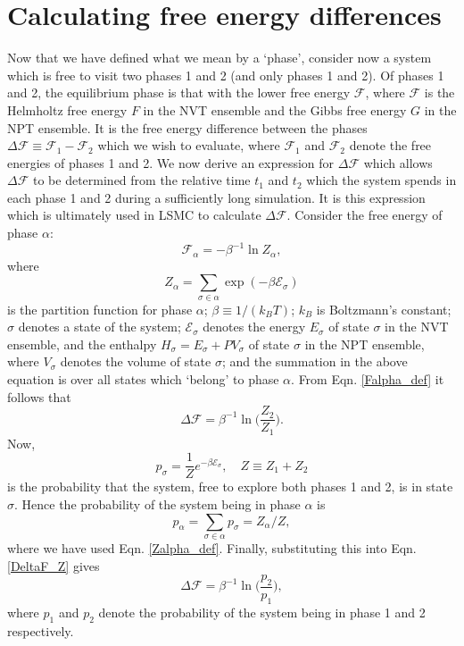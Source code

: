 \documentclass{report}
\begin{document}
\section{Calculating free energy differences}
Now that we have defined what we mean by a `phase', consider now a system which is free to visit two phases 1 and 2 (and only phases 1 and 2).
Of phases 1 and 2, the equilibrium phase is that with the lower free energy $\mathcal{F}$, where $\mathcal{F}$ is the Helmholtz free energy $F$ in the 
NVT ensemble and the Gibbs free energy $G$ in the NPT ensemble. It is the free energy difference between the phases 
$\Delta\mathcal{F}\equiv \mathcal{F}_1-\mathcal{F}_2$ which we wish to evaluate, where $\mathcal{F}_1$ and $\mathcal{F}_2$ denote the free energies of 
phases 1 and 2.
We now derive an expression for $\Delta \mathcal{F}$ which allows $\Delta \mathcal{F}$ to be determined from the relative time $t_1$ and $t_2$ which 
the system spends in each phase 1 and 2 during a sufficiently long simulation. It is this expression which is ultimately used in LSMC to calculate 
$\Delta \mathcal{F}$. Consider the free energy of phase $\alpha$:
\begin{equation}\label{Falpha_def}
\mathcal{F}_{\alpha}=-\beta^{-1}\ln Z_{\alpha},
\end{equation}
where
\begin{equation}\label{Zalpha_def}
Z_{\alpha}=\sum_{\sigma\in\alpha}\exp(-\beta \mathcal{E}_{\sigma})
\end{equation}
is the partition function for phase $\alpha$; $\beta\equiv 1/(k_BT)$; $k_B$ is Boltzmann's constant; $\sigma$ denotes a state of the system;
$\mathcal{E}_{\sigma}$ denotes the energy $E_{\sigma}$ of state $\sigma$ in the NVT ensemble, and the enthalpy $H_{\sigma}=E_{\sigma}+PV_{\sigma}$ of
state $\sigma$ in the NPT ensemble, where $V_{\sigma}$ denotes the volume of state $\sigma$; 
and the summation in the above equation is over all states which `belong' to phase $\alpha$. 
From Eqn. \eqref{Falpha_def} it follows that
\begin{equation}\label{DeltaF_Z}
\Delta \mathcal{F}=\beta^{-1}\ln\biggl(\frac{Z_2}{Z_1}\biggr).
\end{equation}
Now,
\begin{equation}\label{MC_prob}
p_{\sigma}=\frac{1}{Z}e^{-\beta \mathcal{E}_{\sigma}}, \quad Z\equiv Z_1+Z_2
\end{equation}
is the probability that the system, free to explore both phases 1 and 2, is in state $\sigma$. Hence the probability of the system being in
phase $\alpha$ is
\begin{equation}
p_{\alpha} = \sum_{\sigma\in \alpha}p_{\sigma} = Z_{\alpha}/Z,
\end{equation}
where we have used Eqn. \eqref{Zalpha_def}. Finally, substituting this into Eqn. \eqref{DeltaF_Z} gives
\begin{equation}\label{DeltaF_stat_mech}
\Delta \mathcal{F}=\beta^{-1}\ln\biggl(\frac{p_2}{p_1}\biggr),
\end{equation}
where $p_1$ and $p_2$ denote the probability of the system being in phase 1 and 2 respectively. 
\end{document}
